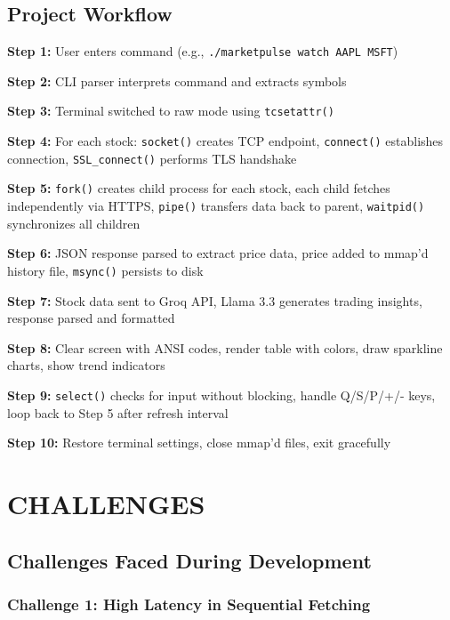 \documentclass[12pt,a4paper]{article}
\begin{document}
\subsection{Project Workflow}

\textbf{Step 1:} User enters command (e.g., \texttt{./marketpulse watch AAPL MSFT})

\textbf{Step 2:} CLI parser interprets command and extracts symbols

\textbf{Step 3:} Terminal switched to raw mode using \texttt{tcsetattr()}

\textbf{Step 4:} For each stock: \texttt{socket()} creates TCP endpoint, \texttt{connect()} establishes connection, \texttt{SSL\_connect()} performs TLS handshake

\textbf{Step 5:} \texttt{fork()} creates child process for each stock, each child fetches independently via HTTPS, \texttt{pipe()} transfers data back to parent, \texttt{waitpid()} synchronizes all children

\textbf{Step 6:} JSON response parsed to extract price data, price added to mmap'd history file, \texttt{msync()} persists to disk

\textbf{Step 7:} Stock data sent to Groq API, Llama 3.3 generates trading insights, response parsed and formatted

\textbf{Step 8:} Clear screen with ANSI codes, render table with colors, draw sparkline charts, show trend indicators

\textbf{Step 9:} \texttt{select()} checks for input without blocking, handle Q/S/P/+/- keys, loop back to Step 5 after refresh interval

\textbf{Step 10:} Restore terminal settings, close mmap'd files, exit gracefully

\newpage

\section{CHALLENGES}

\subsection{Challenges Faced During Development}

\subsubsection{Challenge 1: High Latency in Sequential Fetching}
\end{document}

